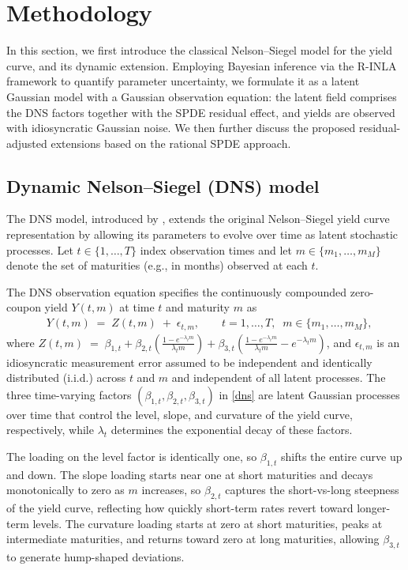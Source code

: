 \documentclass[
  12pt]{article}
\begin{document}
\section{Methodology}\label{sec:methodology}

In this section, we first introduce the classical Nelson--Siegel model for the yield curve, and its dynamic extension. Employing Bayesian inference via the R-INLA framework to quantify parameter uncertainty, we formulate it as a latent Gaussian model with a Gaussian observation equation: the latent field comprises the DNS factors together with the SPDE residual effect, and yields are observed with idiosyncratic Gaussian noise. We then further discuss the proposed residual-adjusted extensions based on the rational SPDE approach.

\subsection{Dynamic Nelson–Siegel (DNS) model}
The DNS model, introduced by \cite{diebold2006forecasting}, extends the original Nelson--Siegel yield curve representation by allowing its parameters to evolve over time as latent stochastic processes. Let $t\in\{1,\ldots,T\}$ index observation times and let $m\in\{m_1,\ldots,m_M\}$ denote the set of maturities (e.g., in months) observed at each $t$.

The DNS observation equation specifies the continuously compounded zero-coupon yield $Y(t,m)$ at time $t$ and maturity $m$ as
\begin{align}\label{dns}
    &Y(t,m) \;=\; Z(t,m) \;+\; \epsilon_{t,m}, \qquad t=1,\ldots,T,\;\; m\in\{m_1,\ldots,m_M\},
\end{align}
where $Z(t,m) \;=\; \beta_{1,t} + \beta_{2,t}\left(\frac{1-e^{-\lambda_t m}}{\lambda_t m}\right) + \beta_{3,t}\left(\frac{1-e^{-\lambda_t m}}{\lambda_t m} - e^{-\lambda_t m}\right)$, and $\epsilon_{t,m}$ is an idiosyncratic measurement error assumed to be independent and identically distributed (i.i.d.) across $t$ and $m$ and independent of all latent processes. The three time-varying factors $(\beta_{1,t},\beta_{2,t},\beta_{3,t})$ in \eqref{dns} are latent Gaussian processes over time that control the level, slope, and curvature of the yield curve, respectively, while $\lambda_t$ determines the exponential decay of these factors.

The loading on the level factor is identically one, so $\beta_{1,t}$ shifts the entire curve up and down. The slope loading starts near one at short maturities and decays monotonically to zero as $m$ increases, so $\beta_{2,t}$ captures the short-vs-long steepness of the yield curve, reflecting how quickly short-term rates revert toward longer-term levels. The curvature loading starts at zero at short maturities, peaks at intermediate maturities, and returns toward zero at long maturities, allowing $\beta_{3,t}$ to generate hump-shaped deviations.
\end{document}
